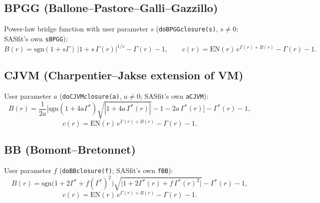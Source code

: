 \documentclass[11pt,a4paper]{article}
\newcommand{\code}[1]{\texttt{#1}}
\begin{document}
\subsection{BPGG (Ballone--Pastore--Galli--Gazzillo) \cite{ballone1986}}
Power-law bridge function with user parameter $s$ (\code{doBPGGclosure(s)},
$s\ne0$; SASfit's own \code{sBPGG}):
\begin{equation}
  B(r) = \mathrm{sgn}(1{+}s\Gamma)\,|1+s\,\Gamma(r)|^{1/s} - \Gamma(r) - 1, \qquad
  c(r) = \mathrm{EN}(r)\,e^{\Gamma(r)+B(r)} - \Gamma(r) - 1.
\end{equation}

\subsection{CJVM (Charpentier--Jakse extension of VM) \cite{charpentierjakse2001,vompemartynov1994}}
User parameter $a$ (\code{doCJVMclosure(a)}, $a\ne0$; SASfit's own
\code{aCJVM}):
\begin{equation}
  B(r) = \frac{1}{2a}\Big[\mathrm{sgn}(1{+}4a\Gamma^*)\sqrt{|1+4a\,\Gamma^*(r)|} - 1 - 2a\,\Gamma^*(r)\Big] - \Gamma^*(r) - 1,
\end{equation}
\begin{equation}
  c(r) = \mathrm{EN}(r)\,e^{\Gamma(r)+B(r)} - \Gamma(r) - 1.
\end{equation}

\subsection{BB (Bomont--Bretonnet) \cite{bomontbretonnet2001}}
User parameter $f$ (\code{doBBclosure(f)}; SASfit's own \code{fBB}):
\begin{equation}
  B(r) = \mathrm{sgn}\!\big(1{+}2\Gamma^*{+}f(\Gamma^*)^2\big)\sqrt{\big|1+2\Gamma^*(r)+f\,\Gamma^*(r)^2\big|} - \Gamma^*(r) - 1,
\end{equation}
\begin{equation}
  c(r) = \mathrm{EN}(r)\,e^{\Gamma(r)+B(r)} - \Gamma(r) - 1.
\end{equation}
\end{document}
